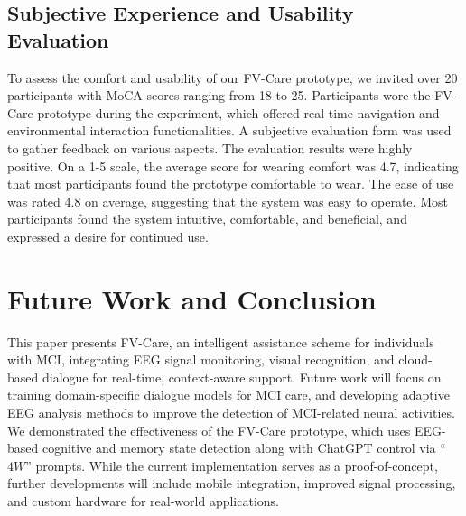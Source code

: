 \documentclass[conference]{IEEEtran}
\begin{document}
\subsection{Subjective Experience and Usability Evaluation}

To assess the comfort and usability of our FV-Care prototype, we invited over 20 participants with MoCA scores ranging from 18 to 25. Participants wore the FV-Care prototype during the experiment, which offered real-time navigation and environmental interaction functionalities. A subjective evaluation form was used to gather feedback on various aspects. The evaluation results were highly positive. On a 1-5 scale, the average score for wearing comfort was 4.7, indicating that most participants found the prototype comfortable to wear. The ease of use was rated 4.8 on average, suggesting that the system was easy to operate. Most participants found the system intuitive, comfortable, and beneficial, and expressed a desire for continued use.







\section{Future Work and Conclusion}

This paper presents FV-Care, an intelligent assistance scheme for individuals with MCI, integrating EEG signal monitoring, visual recognition, and cloud-based dialogue for real-time, context-aware support. Future work will focus on  training domain-specific dialogue models for MCI care, and developing adaptive EEG analysis methods to improve the detection of MCI-related neural activities. We demonstrated the effectiveness of the FV-Care prototype, which uses EEG-based cognitive and memory state detection along with ChatGPT control via ``$4W$'' prompts. While the current implementation serves as a proof-of-concept, further developments will include mobile integration, improved signal processing, and custom hardware for real-world applications. 



\balance

\end{document}
